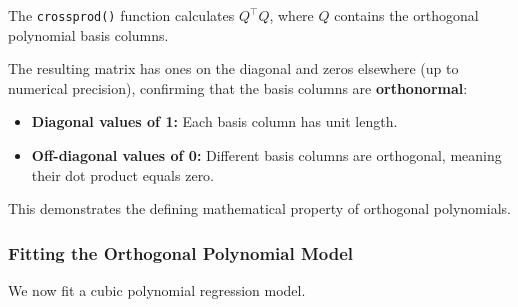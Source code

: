 \documentclass[
  letterpaper,
  DIV=11,
  numbers=noendperiod]{scrreprt}
\providecommand{\tightlist}{%
  \setlength{\itemsep}{0pt}\setlength{\parskip}{0pt}}
\begin{document}
The \texttt{crossprod()} function calculates \(Q^\top Q\), where \(Q\)
contains the orthogonal polynomial basis columns.

The resulting matrix has ones on the diagonal and zeros elsewhere (up to
numerical precision), confirming that the basis columns are
\textbf{orthonormal}:

\begin{itemize}
\tightlist
\item
  \textbf{Diagonal values of 1:} Each basis column has unit length.
\item
  \textbf{Off-diagonal values of 0:} Different basis columns are
  orthogonal, meaning their dot product equals zero.
\end{itemize}

This demonstrates the defining mathematical property of orthogonal
polynomials.

\subsubsection{Fitting the Orthogonal Polynomial
Model}\label{fitting-the-orthogonal-polynomial-model}

We now fit a cubic polynomial regression model.
\end{document}
